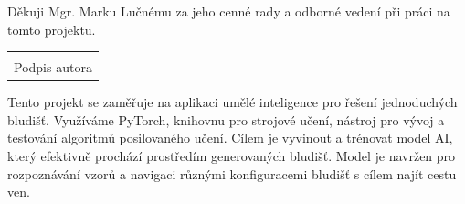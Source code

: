 \documentclass[12pt, a4paper,
twoside,        %
openright
]{report}
\newcommand\datumOdevzdani{1. 1. 2024} %
\begin{document}
\cleardoublepage %
	

	
	\noindent Děkuji Mgr. Marku Lučnému za jeho cenné rady a odborné vedení při práci na tomto projektu.
	
	\vspace*{0.7\textheight} %

	\vfill
	\noindent{V Opavě \datumOdevzdani\\}
	\noindent
	\begin{minipage}{\linewidth}
		\hspace{9.5cm} 
		\begin{tabular}{@{}p{6cm}@{}}
			\dotfill \\
			Podpis autora
		\end{tabular}
	\end{minipage}
	
	\cleardoublepage %


\noindent Tento projekt se zaměřuje na aplikaci umělé inteligence pro řešení jednoduchých bludišť. Využíváme PyTorch, knihovnu pro strojové učení, nástroj pro vývoj a testování algoritmů posilovaného učení. Cílem je vyvinout a trénovat model AI, který efektivně prochází prostředím generovaných bludišť. Model je navržen pro rozpoznávání vzorů a navigaci různými konfiguracemi bludišť s cílem najít cestu ven.

\vspace{18pt}
\end{document}
